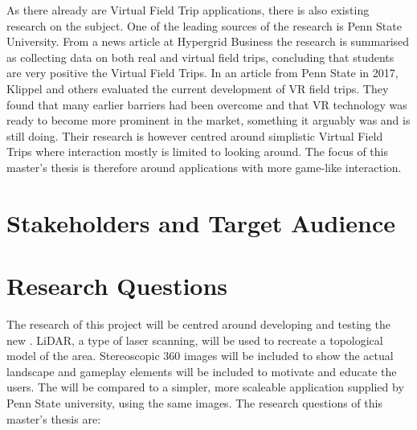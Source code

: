     As there already are Virtual Field Trip applications, there is also existing research on the subject. One of the leading sources of the research is Penn State University. From a news article at Hypergrid Business\cite{hypergrid} the research is summarised as collecting data on both real and virtual field trips, concluding that students are very positive the Virtual Field Trips. In an article from Penn State in 2017, Klippel and others\cite{developing_and_evaluating} evaluated the current development of VR field trips. They found that many earlier barriers had been overcome and that VR technology was ready to become more prominent in the market, something it arguably was and is still doing. Their research is however centred around simplistic Virtual Field Trips where interaction mostly is limited to looking around. The focus of this master's thesis is therefore around applications with more game-like interaction.
    
\section{Stakeholders and Target Audience}
    

\section{Research Questions}
    The research of this project will be centred around developing and testing the new \ApplicationName. LiDAR, a type of laser scanning, will be used to recreate a topological model of the area. Stereoscopic 360 images will be included to show the actual landscape and gameplay elements will be included to motivate and educate the users. The \ApplicationName \hspace{0.1cm}will be compared to a simpler, more scaleable application supplied by Penn State university, using the same images. The research questions of this master's thesis are:
    
    \SPACE
    
